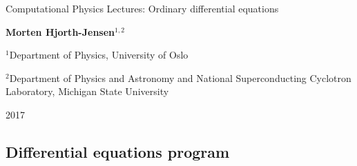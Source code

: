 \documentclass[%
oneside,                 %
final,                   %
10pt]{article}
\begin{document}

\newcommand{\exercisesection}[1]{\subsection*{#1}}






\thispagestyle{empty}

\begin{center}
{\LARGE\bf
\begin{spacing}{1.25}
Computational Physics  Lectures: Ordinary differential equations
\end{spacing}
}
\end{center}


\begin{center}
{\bf Morten Hjorth-Jensen${}^{1, 2}$} \\ [0mm]
\end{center}

\begin{center}
\centerline{{\small ${}^1$Department of Physics, University of Oslo}}
\centerline{{\small ${}^2$Department of Physics and Astronomy and National Superconducting Cyclotron Laboratory, Michigan State University}}
\end{center}
    

\begin{center}
2017
\end{center}

\vspace{1cm}


\subsection{Differential equations program}

\end{document}
